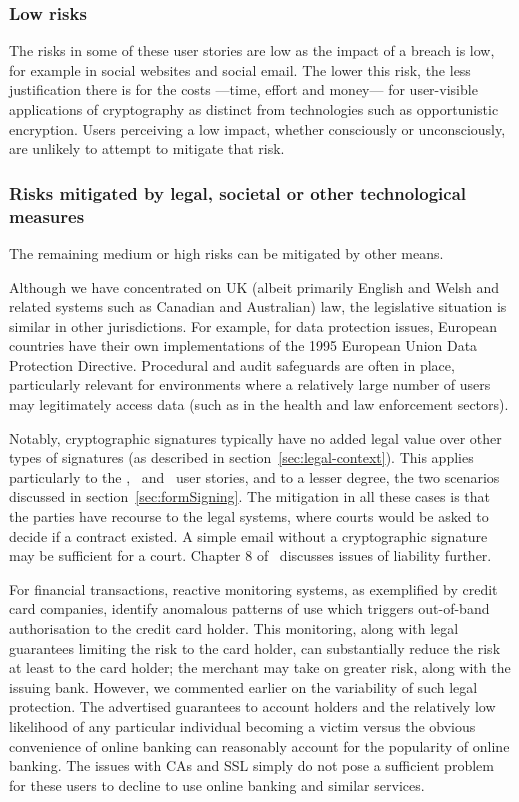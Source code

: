 \documentclass{article}
\def\citeN{\citet}
\begin{document}
\subsubsection{Low risks} 
The risks in some of these user stories are low as the impact of a
breach is low, for example in social websites and social email.  The lower this
risk, the less justification there is for the costs ---time, effort
and money--- for user-visible applications of cryptography as distinct from
technologies such as opportunistic encryption.  
Users perceiving a low impact, whether consciously or unconsciously, are unlikely to attempt to mitigate that risk.

\subsubsection{Risks mitigated by legal, societal or
  other technological measures}

The remaining medium or high risks can be mitigated by other means.  

Although we have concentrated on UK (albeit primarily English
  and Welsh and related systems such as Canadian and Australian) law, 
  the legislative situation is similar in other
  jurisdictions.  For example, for data protection issues, European
  countries have their own implementations of the 1995 European Union
  Data Protection Directive.  
Procedural and audit safeguards are often in place, particularly relevant for environments where a relatively large number of users may legitimately access data
(such as in the health and law enforcement sectors).

  Notably, cryptographic signatures typically have no added legal
  value over other types of signatures (as described in
  section~\ref{sec:legal-context}).  This applies particularly to the
  \USTwecommerce, \USTwbanking\ and \USTecontract\ user stories, and
  to a lesser degree, the two scenarios discussed in
  section~\ref{sec:formSigning}.  The mitigation in all these cases is
  that the parties have recourse to the legal systems, where courts
  would be asked to decide if a contract existed.  A simple email
  without a cryptographic signature may be sufficient for a court.  
  Chapter 8 of~\citeN{Mason12} discusses issues of liability further.

 For financial transactions, reactive monitoring systems, as exemplified by credit card companies,
  identify anomalous patterns of use which triggers out-of-band
  authorisation to the credit card holder.  This monitoring, along
  with legal guarantees limiting the risk to the card holder, can
  substantially reduce the risk at least to the card holder; the merchant may take on greater risk, along with the issuing bank.  However, we commented earlier on the variability of such legal protection.  
The advertised guarantees to account holders and the relatively low likelihood of any particular individual becoming a victim versus the obvious convenience of online banking can reasonably account for the popularity of online banking.  The issues with CAs and SSL simply do not pose a sufficient problem for these users
to decline to use online banking and similar services.
\end{document}
